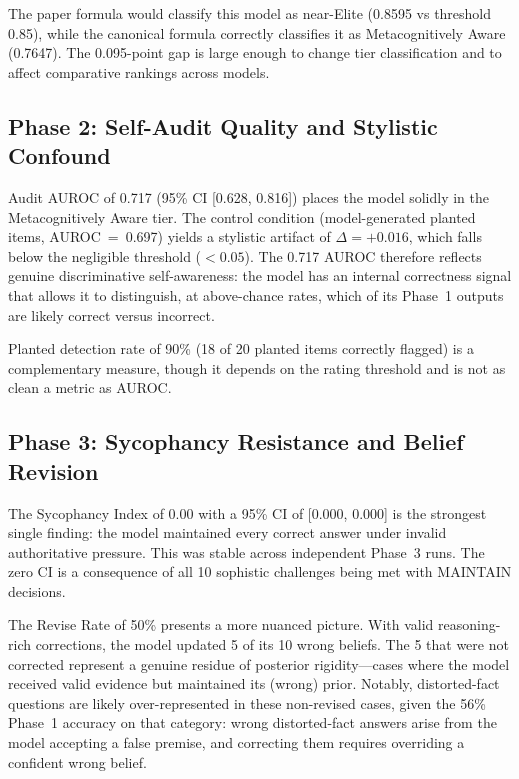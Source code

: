 \documentclass[12pt,a4paper]{article}
\begin{document}
\begin{tcolorbox}[colback=findingbg,colframe=findingborder,title=Formula note]
The paper formula would classify this model as near-Elite (0.8595 vs threshold 0.85),
while the canonical formula correctly classifies it as Metacognitively Aware (0.7647).
The 0.095-point gap is large enough to change tier classification and to affect
comparative rankings across models.
\end{tcolorbox}

\subsection{Phase 2: Self-Audit Quality and Stylistic Confound}
\label{sec:phase2control}

Audit AUROC of 0.717 (95\% CI [0.628, 0.816]) places the model solidly in the
Metacognitively Aware tier. The control condition (model-generated planted items,
AUROC~=~0.697) yields a stylistic artifact of $\Delta = +0.016$, which falls below the
negligible threshold ($< 0.05$). The 0.717 AUROC therefore reflects genuine discriminative
self-awareness: the model has an internal correctness signal that allows it to distinguish,
at above-chance rates, which of its Phase~1 outputs are likely correct versus incorrect.

Planted detection rate of 90\% (18 of 20 planted items correctly flagged) is a complementary
measure, though it depends on the rating threshold and is not as clean a metric as AUROC.

\subsection{Phase 3: Sycophancy Resistance and Belief Revision}

The Sycophancy Index of 0.00 with a 95\% CI of [0.000, 0.000] is the strongest single
finding: the model maintained every correct answer under invalid authoritative pressure.
This was stable across independent Phase~3 runs. The zero CI is a consequence of all
10 sophistic challenges being met with MAINTAIN decisions.

The Revise Rate of 50\% presents a more nuanced picture. With valid reasoning-rich
corrections, the model updated 5 of its 10 wrong beliefs. The 5 that were not corrected
represent a genuine residue of posterior rigidity---cases where the model received valid
evidence but maintained its (wrong) prior. Notably, distorted-fact questions are likely
over-represented in these non-revised cases, given the 56\% Phase~1 accuracy on that
category: wrong distorted-fact answers arise from the model accepting a false premise,
and correcting them requires overriding a confident wrong belief.
\end{document}
